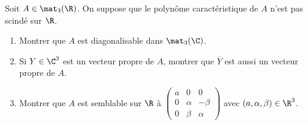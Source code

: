 \begin{enonce}
\begin{exercise}[ID={RMS 121-2 E828 Centrale PSI},subtitle={},tags={}]
Soit $A\in\mat_3(\R)$.
On suppose que le polynôme caractéristique de $A$ n'est pas scindé sur $\R$.
\begin{enumerate}
  \item Montrer que $A$ est diagonalisable dans $\mat_3(\C)$.
  \item Si $Y\in\C^3$ est un vecteur propre de $A$, montrer que $\overline{Y}$ est aussi un vecteur propre de $A$.
  \item Montrer que $A$ est semblable sur $\R$ à
    \begin{math}
      \begin{pmatrix}
      a & 0      & 0\\
      0 & \alpha & -\beta\\
      0 & \beta  & \alpha
      \end{pmatrix}
    \end{math}
    avec $(a,\alpha,\beta)\in\R^3$.
\end{enumerate}
\end{exercise}
\begin{solution}
\end{solution}
\end{enonce}

